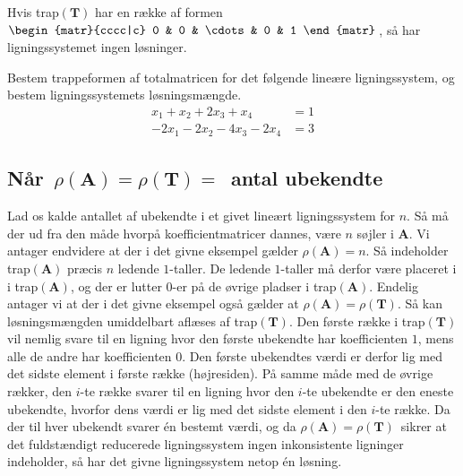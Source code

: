 \begin{aha}
Hvis trap$(\mathbf T)$ har en række af formen $ \begin{matr}{cccc|c} 0 & 0 & \cdots & 0 & 1 \end{matr} \, $, så har ligningssystemet ingen løsninger.
\end{aha}

\begin{exercise}
Bestem trappeformen af totalmatricen for det følgende lineære ligningssystem, og bestem lig\-nings\-sy\-stem\-ets løsningsmængde.
\begin{equation}
\begin{aligned}
x_1+x_2+2x_3+x_4&=1\\
-2x_1-2x_2-4x_3-2x_4&=3
\end{aligned}
\end{equation}
\end{exercise}

\subsection{Når $\,\rho(\mathbf A)=\rho(\mathbf T)=\,$ antal ubekendte}

Lad os kalde antallet af ubekendte i et givet lineært ligningssystem for $n$. Så må der ud fra den måde hvorpå koefficientmatricer dannes, være $n$ søjler i $\mathbf A$.\bs
Vi antager endvidere at der i det givne eksempel gælder $\rho(\mathbf A)=n$. Så indeholder trap$(\mathbf A)$ præcis $n$ ledende $1$-taller. De ledende $1$-taller må derfor være placeret i  i trap$(\mathbf A)$, og der er lutter $0$-er på de øvrige pladser i  trap$(\mathbf A)$.\bs
Endelig antager vi at der i det givne eksempel også gælder at $\rho(\mathbf A)=\rho(\mathbf T)$. Så kan løsningsmængden umiddelbart aflæses af trap$(\mathbf T)$. Den første række i trap$(\mathbf T)$ vil nemlig svare til en ligning hvor den første ubekendte har koefficienten $1$, mens alle de andre har koefficienten $0$. Den første ubekendtes værdi er derfor lig med det sidste element i første række (højresiden). På samme måde med de øvrige rækker, den $i$-te række svarer til en ligning hvor den $i$-te ubekendte er den eneste ubekendte, hvorfor dens værdi er lig med det sidste element i den $i$-te række. Da der til hver ubekendt svarer én bestemt værdi, og da $\rho(\mathbf A)=\rho(\mathbf T)\,$ sikrer at det fuldstændigt reducerede ligningssystem ingen inkonsistente ligninger indeholder, så har det givne ligningssystem netop én løsning.

